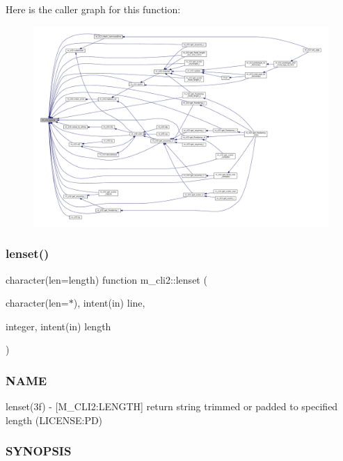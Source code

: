 Here is the caller graph for this function\+:\nopagebreak
\begin{figure}[H]
\begin{center}
\leavevmode
\includegraphics[width=350pt]{namespacem__cli2_a4c12c311327951984c6e1611da23cdfd_icgraph}
\end{center}
\end{figure}
\mbox{\label{namespacem__cli2_ad13853611abfee00d40ffa020662ec8a}} 
\subsubsection{\texorpdfstring{lenset()}{lenset()}}
{\footnotesize\ttfamily character(len=length) function m\+\_\+cli2\+::lenset (\begin{DoxyParamCaption}\item[{character(len=$\ast$), intent(in)}]{line,  }\item[{integer, intent(in)}]{length }\end{DoxyParamCaption})\hspace{0.3cm}{\ttfamily [private]}}



\subsubsection*{N\+A\+ME}

lenset(3f) -\/ \mbox{[}M\+\_\+\+C\+L\+I2\+:L\+E\+N\+G\+TH\mbox{]} return string trimmed or padded to specified length (L\+I\+C\+E\+N\+SE\+:PD) 

\subsubsection*{S\+Y\+N\+O\+P\+S\+IS}

